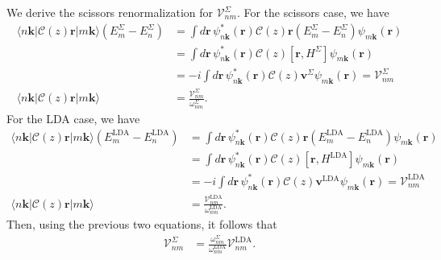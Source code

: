 We derive the scissors renormalization for
$\boldsymbol{\mathcal{V}}^{\Sigma}_{nm}$. For the scissors case, we have
\begin{align}\label{cdg.1}
\langle n\mathbf{k}\vert\mathcal{C}(z)\mathbf{r}\vert m\mathbf{k}\rangle(E^\Sigma_m-E^\Sigma_n) 
&=
\int d\mathbf{r}\,\psi^*_{n\mathbf{k}}(\mathbf{r}) 
\mathcal{C}(z)\mathbf{r} (E^\Sigma_m-E^\Sigma_n) 
\psi_{m\mathbf{k}}(\mathbf{r}) 
\nonumber\\
&=
\int d\mathbf{r}\,\psi^*_{n\mathbf{k}}(\mathbf{r}) 
\mathcal{C}(z)[\mathbf{r},H^\Sigma]
\psi_{m\mathbf{k}}(\mathbf{r}) 
\nonumber\\
&=
-i\int d\mathbf{r}\,\psi^*_{n\mathbf{k}}(\mathbf{r}) 
\mathcal{C}(z)\mathbf{v}^\Sigma 
\psi_{m\mathbf{k}}(\mathbf{r}) 
= \boldsymbol{\mathcal{V}}^\Sigma_{nm}\nonumber\\
\langle n\mathbf{k}\vert\mathcal{C}(z)\mathbf{r}\vert m\mathbf{k}\rangle
&= \frac{\boldsymbol{\mathcal{V}}^\Sigma_{nm}}{\omega^\Sigma_{nm}}.
\end{align}
For the LDA case, we have
\begin{align}
\langle n\mathbf{k}\vert\mathcal{C}(z)\mathbf{r}\vert m\mathbf{k}\rangle(E^\mathrm{LDA}_m-E^\mathrm{LDA}_n) 
&=
\int d\mathbf{r}\,\psi^*_{n\mathbf{k}}(\mathbf{r}) 
\mathcal{C}(z)\mathbf{r} (E^\mathrm{LDA}_m-E^\mathrm{LDA}_n) 
\psi_{m\mathbf{k}}(\mathbf{r}) 
\nonumber\\
&=
\int d\mathbf{r}\,\psi^*_{n\mathbf{k}}(\mathbf{r}) 
\mathcal{C}(z)[\mathbf{r},H^\mathrm{LDA}]
\psi_{m\mathbf{k}}(\mathbf{r}) 
\nonumber\\
&=
-i\int d\mathbf{r}\,\psi^*_{n\mathbf{k}}(\mathbf{r}) 
\mathcal{C}(z)\mathbf{v}^\mathrm{LDA} 
\psi_{m\mathbf{k}}(\mathbf{r}) 
=
\boldsymbol{\mathcal{V}}^\mathrm{LDA}_{nm}
\nonumber\\
\langle n\mathbf{k}\vert\mathcal{C}(z)\mathbf{r}\vert m\mathbf{k}\rangle
&= \frac{\boldsymbol{\mathcal{V}}^\mathrm{LDA}_{nm}}{\omega^\mathrm{LDA}_{nm}}.
\end{align}
Then, using the previous two equations, it follows that
\begin{align}
\boldsymbol{\mathcal{V}}^\Sigma_{nm}
&= \frac{\omega^\Sigma_{nm}}{\omega^\mathrm{LDA}_{nm}}
\boldsymbol{\mathcal{V}}^\mathrm{LDA}_{nm}.
\end{align}

\stopcontents[chapters]
